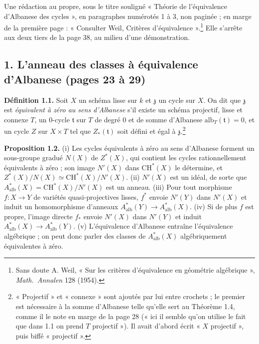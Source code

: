 \documentclass[11pt,a4paper]{article}
\begin{document}
Une rédaction au propre, sous le titre souligné « Théorie de l'équivalence
d'Albanese des cycles », en paragraphes numérotés 1 à 3, non paginée ; en
marge de la première page : « Consulter Weil, Critères
d'équivalence ».\footnote{Sans doute A. Weil, « Sur les critères d'équivalence
en géométrie algébrique », \emph{Math.\ Annalen} 128 (1954).} Elle s'arrête aux
deux tiers de la page 38, au milieu d'une démonstration.

\subsection*{1. L'anneau des classes à équivalence d'Albanese (pages 23 à 29)}

\textbf{Définition 1.1.} Soit $X$ un schéma lisse sur $k$ et $\mathfrak{z}$ un
cycle sur $X$. On dit que $\mathfrak{z}$ est \emph{équivalent à zéro au sens
d'Albanese} s'il existe un schéma projectif, lisse et connexe $T$, un
$0$-cycle $\mathfrak{t}$ sur $T$ de degré $0$ et de somme d'Albanese
$\mathrm{alb}_{T}(\mathfrak{t}) = 0$, et un cycle $Z$ sur $X \times T$ tel que
$Z_{*}(\mathfrak{t})$ soit défini et égal à $\mathfrak{z}$.\footnote{« Projectif »
et « connexe » sont ajoutés par lui entre crochets ; le premier est nécessaire à
la somme d'Albanese telle qu'elle sert au Théorème 1.4, comme il le note en
marge de la page 28 (« ici il semble qu'on utilise le fait que dans 1.1 on prend
$T$ projectif »). Il avait d'abord écrit « $X$ projectif », puis biffé
« projectif ».}

\textbf{Proposition 1.2.} (i) Les cycles équivalents à zéro au sens d'Albanese
forment un sous-groupe gradué $N(X)$ de $Z^{*}(X)$, qui contient les cycles
rationnellement équivalents à zéro ; son image $N'(X)$ dans $\mathrm{CH}^{*}(X)$
le détermine, et $Z^{*}(X)/N(X) \simeq \mathrm{CH}^{*}(X)/N'(X)$.
(ii) $N'(X)$ est un idéal, de sorte que $A^{*}_{\mathrm{alb}}(X) =
\mathrm{CH}^{*}(X)/N'(X)$ est un anneau.
(iii) Pour tout morphisme $f \colon X \to Y$ de variétés quasi-projectives
lisses, $f^{*}$ envoie $N'(Y)$ dans $N'(X)$ et induit un homomorphisme d'anneaux
$A^{*}_{\mathrm{alb}}(Y) \to A^{*}_{\mathrm{alb}}(X)$.
(iv) Si de plus $f$ est propre, l'image directe $f_{*}$ envoie $N'(X)$ dans
$N'(Y)$ et induit $A^{*}_{\mathrm{alb}}(X) \to A^{*}_{\mathrm{alb}}(Y)$.
(v) L'équivalence d'Albanese entraîne l'équivalence algébrique ; on peut donc
parler des classes de $A^{*}_{\mathrm{alb}}(X)$ algébriquement équivalentes à
zéro.
\end{document}

